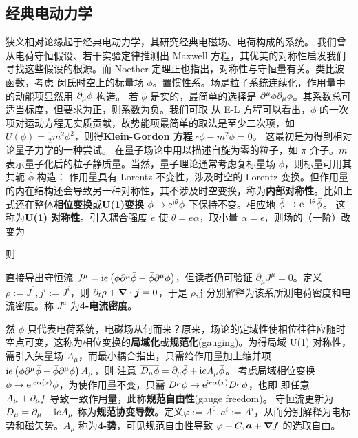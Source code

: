 \subsection{经典电动力学}

狭义相对论缘起于经典电动力学，其研究经典电磁场、电荷构成的系统。
我们曾从电荷守恒假设、若干实验定律推测出 Maxwell 方程，其优美的对称性启发我们寻找这些假设的根源。而 Noether 定理正也指出，对称性与守恒量有关。类比波函数，考虑
闵氏时空上的标量场 $\phi$。置惯性系。场是粒子系统连续化，作用量中的动能项显然用 $\partial_\mu\phi$ 构造。
若 $\phi$ 是实的，最简单的选择是 $\partial^\mu\phi\partial_\mu\phi$。其系数总可适当标度，但要求为正，则系数为负。我们可取
从 E-L 方程可以看出，$\phi$ 的一次项对运动方程无实质贡献，故势能项最简单的取法是至少二次项，如 $U(\phi)=\frac 12 m^2\phi^2$，则得\textbf{Klein-Gordon 方程} $\square\phi-m^2\phi=0$。
这最初是为得到相对论量子力学的一种尝试。
在量子场论中用以描述自旋为零的粒子，如 $\pi$ 介子。$m$ 表示量子化后的粒子静质量。当然，量子理论通常考虑复标量场 $\phi$，则标量可用其共轭 $\bar\phi$ 构造：
作用量具有 Lorentz 不变性，涉及时空的 Lorentz 变换。但作用量的内在结构还会导致另一种对称性，其不涉及时空变换，称为\textbf{内部对称性}。比如上式还在整体\textbf{相位变换}或\textbf{U(1)变换} $\phi \to \mathrm{e}^{\mathrm{i} \theta} \phi$ 下保持不变。相应地 $\bar{\phi} \to \mathrm{e}^{-\mathrm{i} \theta} \bar{\phi}$。
这称为\textbf{U(1) 对称性}。引入耦合强度 $e$ 使 $\theta=e\alpha$，取小量 $\alpha=\epsilon$，则场的（一阶）改变为


则

直接导出守恒流
$J^\mu=\mathrm{i} e\left(\phi\partial^\mu \bar{\phi}-\bar{\phi} \partial^\mu \phi \right)$，但读者仍可验证 $\partial_\mu J^\mu=0$。定义 $\rho:=J^0,j^i:=J^i$，则 $\partial_t\rho+\div\vb* j=0$，于是 $\rho,\bm j$ 分别解释为该系所测电荷密度和电流密度。称 $J^\mu$ 为\textbf{4-电流密度}。

然 $\phi$ 只代表电荷系统，电磁场从何而来？原来，场论的定域性使相位往往应随时空点可变，这称为相位变换的\textbf{局域化}或\textbf{规范化}(gauging)。为得局域 U(1) 对称性，需引入矢量场 $A_\mu$，而最小耦合指出，只需给作用量加上缩并项 $\mathrm{i} e\left(\phi\partial^\mu \bar{\phi}-\bar{\phi} \partial^\mu \phi \right) A_\mu$，则
注意 $\overline{D_\mu \phi}=\partial_\mu \bar\phi+\mathrm{i} e A_\mu \bar\phi$。
考虑局域相位变换 $\phi\to\mathrm{e}^{\mathrm{i} e\alpha(x)} \phi$，为使作用量不变，只需 $D^\mu\phi\to\mathrm{e}^{\mathrm{i} e\alpha(x)}D^\mu\phi$，也即
即任意 $A_\mu+\partial_\mu f$ 导致一致作用量，此称\textbf{规范自由性}(gauge freedom)。
守恒流更新为
$D_\mu=\partial_\mu -\mathrm{i} e A_\mu$ 称为\textbf{规范协变导数}。定义$\varphi:=A^0,a^i:=A^i$，从而分别解释为电标势和磁矢势。$A_\mu$ 称为\textbf{4-势}，可见规范自由性导致 $\varphi+C,\vb* a+\grad f$ 的选取自由。

